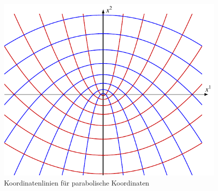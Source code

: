 \begin{figure}
\centering
\includegraphics{chapters/020-koordinaten/uebungsaufgaben/parabolisch.pdf}
\caption{Koordinatenlinien für parabolische Koordinaten
\label{202:fig:koordinatenlinien}}
\end{figure}
